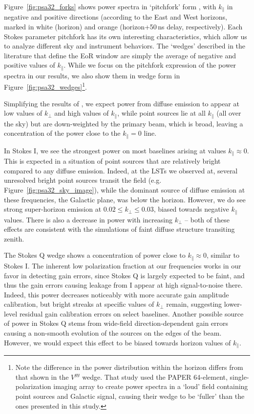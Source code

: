 Figure~\ref{fig:psa32_forks} shows power spectra in `pitchfork' form \citep{Nithya.15a,Nithya.15b}, with $k_{\parallel}$ in negative and positive directions (according to the East and West horizons, marked in white (horizon) and orange (horizon+50\,ns delay, respectively). Each Stokes parameter pitchfork has its own interesting characteristics, which allow us to analyze different sky and instrument behaviors. The `wedges' described in the literature that define the EoR window are simply the average of negative and positive values of $k_{\parallel}$. While we focus on the pitchfork expression of the power spectra in our results, we also show them in wedge form in Figure~\ref{fig:psa32_wedges}\footnote{Note the difference in the power distribution within the horizon differs from that shown in the \citet{Pober.13} $V^{yy}$ wedge. That study used the PAPER 64-element, single-polarization imaging array to create power spectra in a `loud' field containing point sources and Galactic signal, causing their wedge to be `fuller' than the ones presented in this study.}.

Simplifying the results of \citet[][see their papers for a full discussion]{Nithya.15a,Nithya.15b}, we expect power from diffuse emission to appear at low values of $k_{\perp}$ and high values of $k_{\parallel}$, while point sources lie at all $k_{\parallel}$ (all over the sky) but are down-weighted by the primary beam, which is broad, leaving a concentration of the power close to the $k_{\parallel}=0$ line.

In Stokes I, we see the strongest power on most baselines arising at values $k_{\parallel}\approx 0$. This is expected in a situation of point sources that are relatively bright compared to any diffuse emission. Indeed, at the LSTs we observed at, several unresolved bright point sources transit the field (e.g. Figure~{\ref{fig:psa32_sky_image}}), while the dominant source of diffuse emission at these frequencies, the Galactic plane, was below the horizon. However, we do see strong super-horizon emission at $0.02 \leqslant k_{\perp} \leqslant 0.03$, biased towards negative $k_{\parallel}$ values. There is also a decrease in power with increasing $k_{\perp}$ -- both of these effects are consistent with the \citet{Nithya.15b} simulations of faint diffuse structure transiting zenith. 

The Stokes Q wedge shows a concentration of power close to $k_{\parallel}\approx 0$, similar to Stokes I.
The inherent low polarization fraction at our frequencies works in our favor in detecting gain errors, since Stokes Q is largely expected to be faint, and thus the gain errors causing leakage from I appear at high signal-to-noise there.
Indeed, this power decreases noticeably with more accurate gain amplitude calibration, but bright streaks at specific values of $k_{\perp}$ remain, suggesting lower-level residual gain calibration errors on select baselines.  Another possible source of power in Stokes Q stems from wide-field direction-dependent gain errors causing a non-smooth evolution of the sources on the edges of the beam. However, we would expect this effect to be biased towards horizon values of $k_{\parallel}$.

